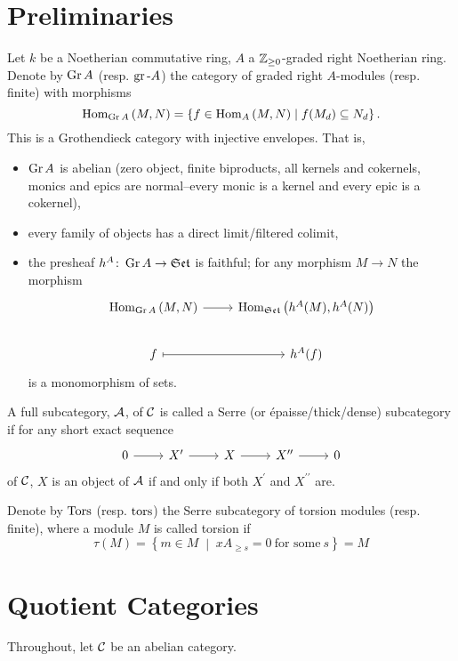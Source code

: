 \documentclass[dissertation.tex]{subfiles}
\begin{document}
\section{Preliminaries}
Let $k$ be a Noetherian commutative ring, $A$ a $\mathbb{Z}_{\geq 0}$-graded right Noetherian ring.
Denote by $\operatorname{Gr}A$ (resp. $\operatorname{gr}\text{-}A$) the category of graded right $A$-modules (resp. finite) with morphisms
$$\operatorname{Hom}_{\operatorname{Gr}A}\left(M,N\right) = \left\{f \in \operatorname{Hom}_{A}\left(M,N\right) \;\middle\vert\; f(M_d) \subseteq N_d\right\}.$$
This is a Grothendieck category with injective envelopes.
That is,
\begin{itemize}
\item
  $\operatorname{Gr}A$ is abelian (zero object, finite biproducts, all kernels and cokernels, monics and epics are normal--every monic is a kernel and every epic is a cokernel),
\item
  every family of objects has a direct limit/filtered colimit,
\item
  the presheaf $h^A \colon \operatorname{Gr}A \rightarrow \mathfrak{Set}$ is faithful; for any morphism $M \rightarrow N$ the morphism
  $$\begin{tikzcd}
    \Hom{\Gr{A}}{M, N} \arrow{r}& \Hom{\Sets}{h^A(M), h^A(N)}\\
    f \arrow[mapsto]{r} & h^A(f)
  \end{tikzcd}$$
  is a monomorphism of sets.
\end{itemize}

\begin{defn}
  A full subcategory, $\mathcal{A}$, of $\mathcal{C}$ is called a Serre (or \'{e}paisse/thick/dense) subcategory if for any short exact sequence
  $$\begin{tikzcd}
    0 \arrow{r} & X^\prime \arrow{r} & X \arrow{r} & X^{\prime\prime} \arrow{r} & 0
  \end{tikzcd}$$
  of $\mathcal{C}$, $X$ is an object of $\mathcal{A}$ if and only if both $X^\prime$ and $X^{\prime\prime}$ are.
\end{defn}

Denote by $\Tors$ (resp. $\operatorname{tors}$) the Serre subcategory of torsion modules (resp. finite), where a module $M$ is called torsion if
$$\tau(M) = \left\{m \in M \;\middle\vert\; xA_{\geq s} = 0\ \text{for some}\ s\right\} = M$$

\section{Quotient Categories}
Throughout, let $\mathcal{C}$ be an abelian category.
\end{document}
